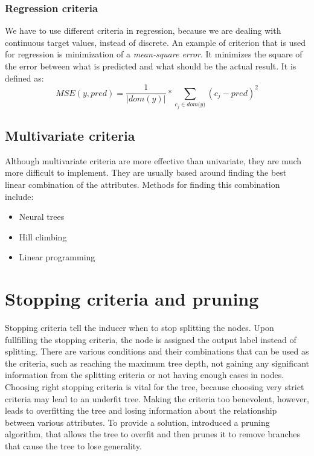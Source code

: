 \documentclass[thesis=B,english]{FITthesis}[2012/10/20]
\begin{document}
				\subsubsection{Regression criteria}

				We have to use different criteria in regression, because we are dealing with continuous target values, instead of discrete. An example of criterion that is used for regression is minimization of a \textit{mean-square error}. It minimizes the square of the error between what is predicted and what should be the actual result. It is defined as:
				\[
					\textit{MSE}\left(y, \textit{pred}\right)= \frac{1}{|dom(y)|}*\sum _{c_j \in \textit{dom(y)}}\left(c_j - \textit{pred}\right)^2
				\]

		\subsection{Multivariate criteria}
			Although multivariate criteria are more effective than univariate, they are much more difficult to implement. They are usually based around finding the best linear combination of the attributes. Methods for finding this combination include:
			\begin{itemize}
				\item Neural trees \cite{NTrees}
				\item Hill climbing \cite{CART}
				\item Linear programming
			\end{itemize}

		\section{Stopping criteria and pruning}
			Stopping criteria tell the inducer when to stop splitting the nodes. Upon fullfilling the stopping criteria, the node is assigned the output label instead of splitting. There are various conditions and their combinations that can be used as the criteria, such as reaching the maximum tree depth, not gaining any significant information from the splitting criteria or not having enough cases in nodes. Choosing right stopping criteria is vital for the tree, because choosing very strict criteria may lead to an underfit tree. Making the criteria too benevolent, however, leads to overfitting the tree and losing information about the relationship between various attributes. To provide a solution, \cite{CART} introduced a pruning algorithm, that allows the tree to overfit and then prunes it to remove branches that cause the tree to lose generality.
				
\end{document}
